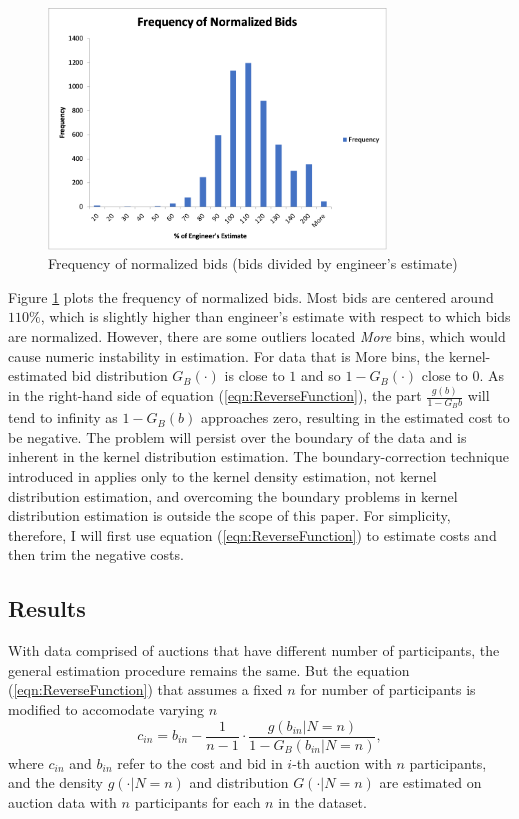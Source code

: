 \documentclass[11pt]{article}
\begin{document}
\begin{figure}[h]
    \includegraphics[width=0.8\textwidth]{BidFrequency.png}
    \centering
    \caption{Frequency of normalized bids (bids divided by engineer's estimate)}
    \label{fig:BidFrequency}
\end{figure}

Figure \ref{fig:BidFrequency} plots the frequency of normalized bids. Most bids 
are centered around $110\%$, which is slightly higher than engineer's estimate 
with respect to which bids are normalized.
However, there are some outliers located \textit{More} bins, 
which would cause numeric instability in estimation. 
For data that is More bins, the kernel-estimated bid distribution 
$G_B(\cdot)$ is close to $1$ and so $1-G_B(\cdot)$ close to 0. As in 
the right-hand side of equation (\ref{eqn:ReverseFunction}), the 
part $\frac{g(b)}{1-G_B{b}}$ will tend to infinity as $1-G_B(b)$ 
approaches zero, resulting in the estimated cost to be negative. 
The problem will persist over the boundary of the data and is 
inherent in the kernel distribution estimation.
The boundary-correction technique introduced in \cite{HickmanHubbard2015}
applies only to the kernel density estimation, not kernel 
distribution estimation, and overcoming 
the boundary problems in kernel distribution estimation is outside the scope 
of this paper. For simplicity, therefore, I will first use equation 
(\ref{eqn:ReverseFunction}) to estimate costs and then trim the negative costs.

\subsection{Results}
With data comprised of auctions that have different number of participants, 
the general estimation procedure remains the same. But the equation 
(\ref{eqn:ReverseFunction}) that assumes a fixed $n$ for number 
of participants is modified to 
accomodate varying $n$ \cite{Matthewetal2018}
\begin{equation}
    c_{in} = b_{in} - \frac{1}{n-1} \cdot \frac{g(b_{in}|N = n)}{1-G_{B}(b_{in}|N=n)},
    \label{eqn:ReverseFunction_N}
\end{equation}
where $c_{in}$ and $b_{in}$ refer to the cost and bid in $i$-th auction 
with $n$ participants, and the density $g(\cdot|N=n)$ and distribution
$G(\cdot|N=n)$ are estimated on auction data with $n$ participants for 
each $n$ in the dataset. 
\end{document}

